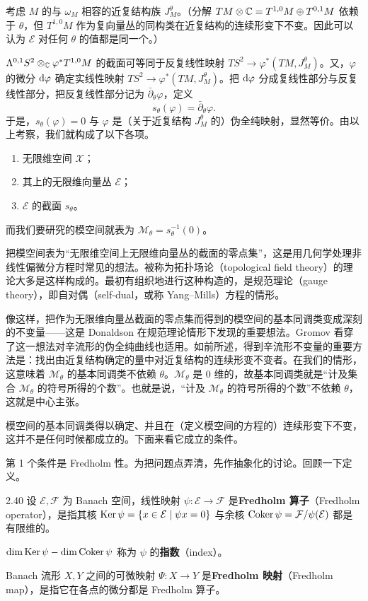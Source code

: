 考虑 $M$ 的与 $\omega_M$ 相容的近复结构族 $J^\theta_M$。（分解 $TM\otimes\mathbb{C}=T^{1,0}M\oplus T^{0,1}M$ 依赖于 $\theta$，但 $T^{1,0}M$ 作为复向量丛的同构类在近复结构的连续形变下不变。因此可以认为 $\mathcal{E}$ 对任何 $\theta$ 的值都是同一个。）

$\Lambda^{0,1}S^2\otimes_{\mathbb{C}}\varphi^*T^{1,0}M$ 的截面可等同于反复线性映射 $TS^2\to\varphi^*(TM,J^\theta_M)$。又，$\varphi$ 的微分 $\mathrm{d}\varphi$ 确定实线性映射 $TS^2\to\varphi^*(TM,J^\theta_M)$。把 $\mathrm{d}\varphi$ 分成复线性部分与反复线性部分，把反复线性部分记为 $\bar\partial_\theta\varphi$，定义
\[
  s_\theta(\varphi)=\bar\partial_\theta\varphi.
\]
于是，$s_\theta(\varphi)=0$ 与 $\varphi$ 是（关于近复结构 $J^\theta_M$ 的）伪全纯映射，显然等价。由以上考察，我们就构成了以下各项。
\begin{enumerate}[label=(\arabic*),leftmargin=2.6em,itemsep=1pt,topsep=2pt]
  \item 无限维空间 $\mathcal{X}$；
  \item 其上的无限维向量丛 $\mathcal{E}$；
  \item $\mathcal{E}$ 的截面 $s_\theta$。
\end{enumerate}
而我们要研究的模空间就表为 $\mathcal{M}_\theta=s_\theta^{-1}(0)$。

把模空间表为“无限维空间上无限维向量丛的截面的零点集”，这是用几何学处理非线性偏微分方程时常见的想法。被称为拓扑场论（topological field theory）的理论大多是这样构成的。最初有组织地进行这种构造的，是规范理论（gauge theory），即自对偶（self-dual，或称 Yang–Mills）方程的情形。

像这样，把作为无限维向量丛截面的零点集而得到的模空间的基本同调类变成深刻的不变量——这是 Donaldson 在规范理论情形下发现的重要想法。Gromov 看穿了这一想法对辛流形的伪全纯曲线也适用。如前所述，得到辛流形不变量的重要方法是：找出由近复结构确定的量中对近复结构的连续形变不变者。在我们的情形，这意味着 $\mathcal{M}_\theta$ 的基本同调类不依赖 $\theta$。$\mathcal{M}_\theta$ 是 0 维的，故基本同调类就是“计及集合 $\mathcal{M}_\theta$ 的符号所得的个数”。也就是说，“计及 $\mathcal{M}_\theta$ 的符号所得的个数”不依赖 $\theta$，这就是中心主张。

模空间的基本同调类得以确定、并且在（定义模空间的方程的）连续形变下不变，这并不是任何时候都成立的。下面来看它成立的条件。

第 1 个条件是 Fredholm 性。为把问题点弄清，先作抽象化的讨论。回顾一下定义。

\begin{definition}{2.40}
  设 $\mathcal{E},\mathcal{F}$ 为 Banach 空间，线性映射 $\psi\colon\mathcal{E}\to\mathcal{F}$ 是\textbf{Fredholm 算子}（Fredholm operator），是指其核 $\operatorname{Ker}\psi=\{x\in\mathcal{E}\mid\psi x=0\}$ 与余核 $\operatorname{Coker}\psi=\mathcal{F}/\psi(\mathcal{E})$ 都是有限维的。

  $\dim\operatorname{Ker}\psi-\dim\operatorname{Coker}\psi$ 称为 $\psi$ 的\textbf{指数}（index）。

  Banach 流形 $X,Y$ 之间的可微映射 $\Psi\colon X\to Y$ 是\textbf{Fredholm 映射}（Fredholm map），是指它在各点的微分都是 Fredholm 算子。
\end{definition}

